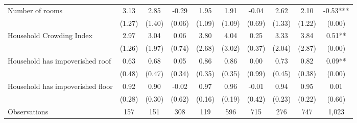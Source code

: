 \begin{tabular}{l*{9}c}
Number of rooms&3.13&2.85&-0.29&1.95&1.91&-0.04&2.62&2.10&-0.53***\\
&(1.27)&(1.40)&(0.06)&(1.09)&(1.09)&(0.69)&(1.33)&(1.22)&(0.00)\\
Household Crowding Index&2.97&3.04&0.06&3.80&4.04&0.25&3.33&3.84&0.51**\\
&(1.26)&(1.97)&(0.74)&(2.68)&(3.02)&(0.37)&(2.04)&(2.87)&(0.00)\\
Household has impoverished roof&0.63&0.68&0.05&0.86&0.86&0.00&0.73&0.82&0.09**\\
&(0.48)&(0.47)&(0.34)&(0.35)&(0.35)&(0.99)&(0.45)&(0.38)&(0.00)\\
Household has impoverished floor&0.92&0.90&-0.02&0.97&0.96&-0.01&0.94&0.95&0.01\\
&(0.28)&(0.30)&(0.62)&(0.16)&(0.19)&(0.42)&(0.23)&(0.22)&(0.66)\\
\hline
Observations & 157 & 151 & 308 & 119 & 596 & 715 & 276 & 747 & 1,023 \\
\hline\hline
\end{tabular}
